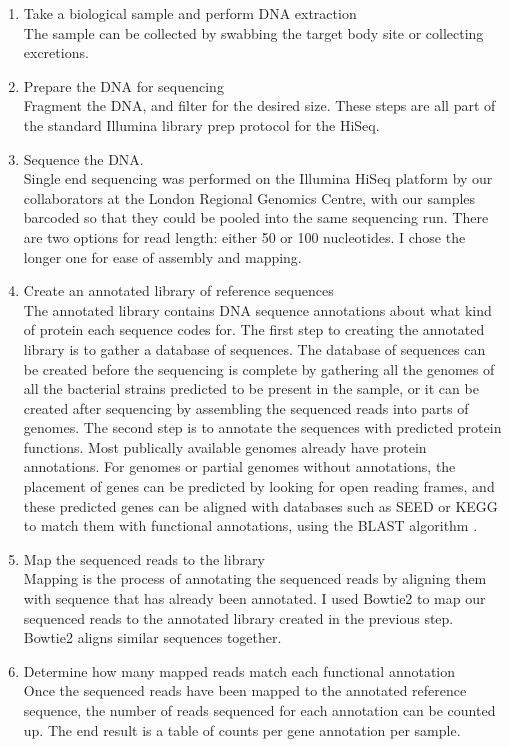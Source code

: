 \begin{enumerate}
\item Take a biological sample and perform DNA extraction\\
The sample can be collected by swabbing the target body site or collecting excretions.

\item Prepare the DNA for sequencing\\
Fragment the DNA, and filter for the desired size. These steps are all part of the standard Illumina library prep protocol for the HiSeq.

\item Sequence the DNA.\\
Single end sequencing was performed on the Illumina HiSeq platform by our collaborators at the London Regional Genomics Centre, with our samples barcoded so that they could be pooled into the same sequencing run. There are two options for read length: either 50 or 100 nucleotides. I chose the longer one for ease of assembly and mapping.

\item Create an annotated library of reference sequences\\
The annotated library contains DNA sequence annotations about what kind of protein each sequence codes for. The first step to creating the annotated library is to gather a database of sequences. The database of sequences can be created before the sequencing is complete by gathering all the genomes of all the bacterial strains predicted to be present in the sample, or it can be created after sequencing by assembling the sequenced reads into parts of genomes. The second step is to annotate the sequences with predicted protein functions. Most publically available genomes already have protein annotations. For genomes or partial genomes without annotations, the placement of genes can be predicted by looking for open reading frames, and these predicted genes can be aligned with databases such as SEED \cite{overbeek2005subsystems} or KEGG \cite{kanehisa2000kegg} to match them with functional annotations, using the BLAST algorithm \cite{altschul1990basic}.

\item Map the sequenced reads to the library\\
Mapping is the process of annotating the sequenced reads by aligning them with sequence that has already been annotated. I used Bowtie2 \cite{langmead2012fast} to map our sequenced reads to the annotated library created in the previous step. Bowtie2 aligns similar sequences together.

\item Determine how many mapped reads match each functional annotation\\
Once the sequenced reads have been mapped to the annotated reference sequence, the number of reads sequenced for each annotation can be counted up. The end result is a table of counts per gene annotation per sample.
\end{enumerate}

